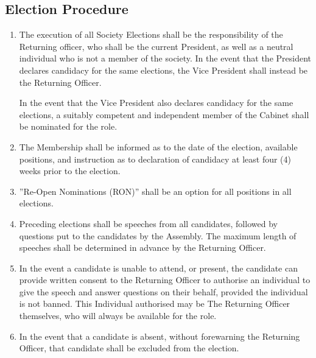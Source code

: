 \documentclass[parskip=half]{scrartcl}
\begin{document}
        \subsection{Election Procedure}
            \label{bye-election--election-procedure}
            \begin{enumerate}
                \item The execution of all Society Elections shall be the responsibility of the Returning officer, who shall be the current President, as well as a neutral individual who is not a member of the society.
                    \subitem In the event that the President declares candidacy for the same elections, the Vice President shall instead be the Returning Officer.
                    
                    \subitem In the event that the Vice President also declares candidacy for the same elections, a suitably competent and independent member of the Cabinet shall be nominated for the role.
                    
                \item The Membership shall be informed as to the date of the election, available positions, and instruction as to declaration of candidacy at least four (4) weeks prior to the election.
                
                \item ”Re-Open Nominations (RON)” shall be an option for all positions in all elections.
                
                \item Preceding elections shall be speeches from all candidates, followed by questions put to the candidates by the Assembly.
                    \subitem The maximum length of speeches shall be determined in advance by the Returning Officer.
                
                \item In the event a candidate is unable to attend, or present, the candidate can provide written consent to the Returning Officer to authorise an individual to give the speech and answer questions on their behalf, provided the individual is not banned.
                    \subitem This Individual authorised may be The Returning Officer themselves, who will always be available for the role.
                
                \item In the event that a candidate is absent, without forewarning the Returning Officer, that candidate shall be excluded from the election.
                

\end{enumerate}
\end{document}

